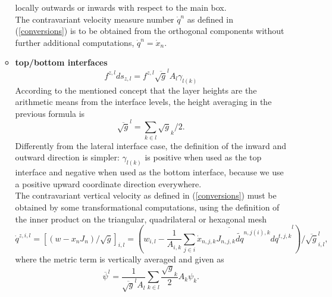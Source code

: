 \begin{itemize}
\begin{itemize}
         locally outwards or inwards with respect to the main box.\\
         The contravariant velocity measure number $\dot{q}^n$ as defined in (\ref{conversions}) is
         to be obtained from the orthogonal components without further additional computations, $\dot{q}^n=\dot{x}_n$.
       \item \textbf{top/bottom interfaces}
         \begin{equation}
         f^{z,l}ds_{z,l} = f^{z,l}\overline{\sqrt{g}}^lA_{l}\gamma_{l(k)}
         \label{vertflux}
         \end{equation}
         According to the mentioned concept that the layer heights are the arithmetic means from the
         interface levels, the height averaging in the previous formula is
         $$\overline{\sqrt{g}}^l=\sum_{k\in l}\sqrt{g}_{k}/2.$$
         Differently from the lateral interface case, the definition of the inward and outward direction
         is simpler: $\gamma_{l(k)}$ is positive when used as the top interface and negative when used as
         the bottom interface, because we use a positive upward coordinate direction everywhere.\\
         The contravariant vertical velocity as defined in (\ref{conversions}) must be obtained by some
         transformational computations, using the definition of the inner product on the triangular, quadrilateral or
         hexagonal mesh
         \begin{equation}
          \dot{q}^{z,i,l} =[(w-x_nJ_n)/\sqrt{g}]_{i,l}=
                     \left(w_{i,l}-\overline{\frac{1}{A_{i,k}}\sum_{j\in i}
                     \dot{x}_{n,j,k}J_{n,j,k}\widetilde{dq}^{n,j(i),k}dq^{t,j,k}}^l\right)/\overline{\sqrt{g}}^l_{i,l},
         \label{contrav_velo}
         \end{equation}
         where the metric term is vertically averaged and given as
         \begin{equation}
          \overline\psi^l=\frac{1}{\overline{\sqrt{g}}^lA_l}\sum_{k\in l}\frac{\sqrt{g}_k}{2} A_k \psi_k.
         \label{avel}
         \end{equation}

 \end{itemize}
\end{itemize}

